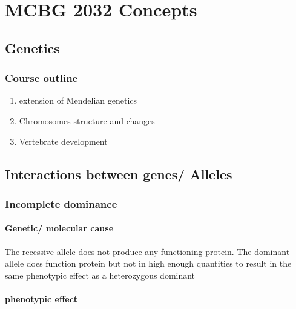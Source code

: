 \documentclass[]{article}
\date{}
\providecommand{\tightlist}{%
  \setlength{\itemsep}{0pt}\setlength{\parskip}{0pt}}
\let\oldparagraph\paragraph
\renewcommand{\paragraph}[1]{\oldparagraph{#1}\mbox{}}
\begin{document}
\hypertarget{mcbg-2032-concepts}{%
\section{MCBG 2032 Concepts}\label{mcbg-2032-concepts}}

\hypertarget{genetics}{%
\subsection{Genetics}\label{genetics}}

\hypertarget{course-outline}{%
\subsubsection{Course outline}\label{course-outline}}

\begin{enumerate}
\def\labelenumi{\arabic{enumi})}
\tightlist
\item
  extension of Mendelian genetics
\item
  Chromosomes structure and changes
\item
  Vertebrate development
\end{enumerate}

\hypertarget{interactions-between-genes-alleles}{%
\subsection{Interactions between genes/
Alleles}\label{interactions-between-genes-alleles}}

\hypertarget{incomplete-dominance}{%
\subsubsection{Incomplete dominance}\label{incomplete-dominance}}

\hypertarget{genetic-molecular-cause}{%
\paragraph{Genetic/ molecular cause}\label{genetic-molecular-cause}}

The recessive allele does not produce any functioning protein. The
dominant allele does function protein but not in high enough quantities
to result in the same phenotypic effect as a heterozygous dominant

\hypertarget{phenotypic-effect}{%
\paragraph{phenotypic effect}\label{phenotypic-effect}}
\end{document}
